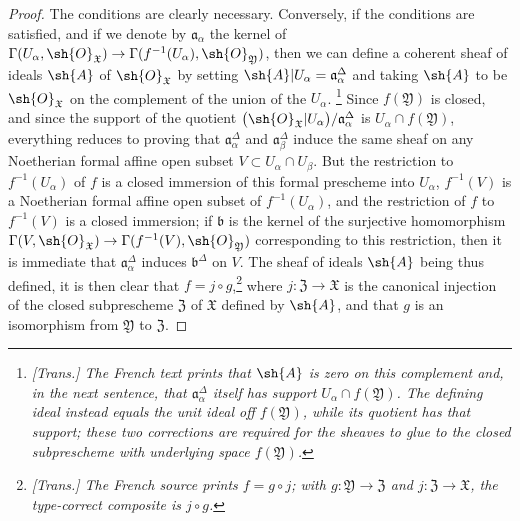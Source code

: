 \begin{proof}
The conditions are clearly necessary.
Conversely, if the conditions are satisfied, and if we denote by $\mathfrak{a}_\alpha$ the kernel of $\Gamma(U_\alpha,\sh{O}_\mathfrak{X})\to\Gamma(f^{-1}(U_\alpha),\sh{O}_\mathfrak{Y})$, then we can define a coherent sheaf of ideals $\sh{A}$ of $\sh{O}_\mathfrak{X}$ by setting $\sh{A}|U_\alpha=\mathfrak{a}_\alpha^\Delta$ and taking $\sh{A}$ to be $\sh{O}_\mathfrak{X}$ on the complement of the union of the $U_\alpha$.
\footnote{\emph{[Trans.] The French text prints that $\sh{A}$ is zero on this complement and, in the next sentence, that $\mathfrak{a}_\alpha^\Delta$ itself has support $U_\alpha\cap f(\mathfrak{Y})$. The defining ideal instead equals the unit ideal off $f(\mathfrak{Y})$, while its quotient has that support; these two corrections are required for the sheaves to glue to the closed subprescheme with underlying space $f(\mathfrak{Y})$.}}
Since $f(\mathfrak{Y})$ is closed, and since the support of the quotient $\bigl(\sh{O}_\mathfrak{X}|U_\alpha\bigr)/\mathfrak{a}_\alpha^\Delta$ is $U_\alpha\cap f(\mathfrak{Y})$, everything reduces to proving that $\mathfrak{a}_\alpha^\Delta$ and $\mathfrak{a}_\beta^\Delta$ induce the same sheaf on any Noetherian formal affine open subset $V\subset U_\alpha\cap U_\beta$.
But the restriction to $f^{-1}(U_\alpha)$ of $f$ is a closed immersion of this formal prescheme into $U_\alpha$, $f^{-1}(V)$ is a Noetherian formal affine open subset of $f^{-1}(U_\alpha)$, and the restriction of $f$ to $f^{-1}(V)$ is a closed immersion;
if $\mathfrak{b}$ is the kernel of the surjective homomorphism $\Gamma(V,\sh{O}_\mathfrak{X})\to\Gamma(f^{-1}(V),\sh{O}_\mathfrak{Y})$ corresponding to this restriction, then it is immediate  that $\mathfrak{a}_\alpha^\Delta$ induces $\mathfrak{b}^\Delta$ on $V$.
The sheaf of ideals $\sh{A}$ being thus defined, it is then clear that $f=j\circ g$,\footnote{\emph{[Trans.] The French source prints $f=g\circ j$; with $g:\mathfrak{Y}\to\mathfrak{Z}$ and $j:\mathfrak{Z}\to\mathfrak{X}$, the type-correct composite is $j\circ g$.}} where $j:\mathfrak{Z}\to\mathfrak{X}$ is the canonical injection of the closed subprescheme $\mathfrak{Z}$ of $\mathfrak{X}$ defined by $\sh{A}$, and that $g$ is an isomorphism from $\mathfrak{Y}$ to $\mathfrak{Z}$.
\end{proof}

